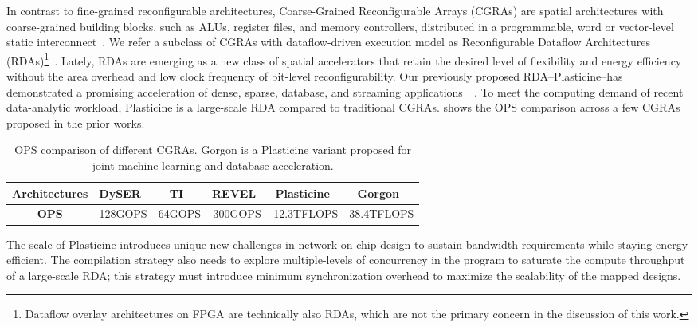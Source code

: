 In contrast to fine-grained reconfigurable architectures,
Coarse-Grained Reconfigurable Arrays (CGRAs) are spatial architectures with 
coarse-grained building blocks, such as ALUs, register files, and memory controllers, 
distributed in a programmable, word or vector-level static interconnect~\cite{adres, kress, dyser, piperench, tartan, 
hrl, hycube}.
We refer a subclass of CGRAs with dataflow-driven execution model as Reconfigurable Dataflow
Architectures (RDAs)\footnote{Dataflow overlay architectures on FPGA are technically also RDAs, which are not the primary concern in the discussion of this work.}~\cite{plasticine, ti, streamdataflow,neuflow,cnndataflow,dataflowarch}.
Lately, RDAs are emerging as a new class of spatial accelerators that retain the desired level of
flexibility and energy efficiency without the area overhead and low clock frequency of bit-level reconfigurability.
Our previously proposed RDA--Plasticine--has demonstrated a promising acceleration of dense, sparse, database, and streaming applications~~\cite{plasticine, gorgon, multijoin,prabhakarthesis}.
To meet the computing demand of recent data-analytic workload, Plasticine is a large-scale RDA
compared to traditional CGRAs. 
 shows the OPS comparison across a few CGRAs proposed in the prior works.

\begin{table}
  \centering
\begin{tabular*}{0.88\textwidth}{cccccc}
  \toprule
  \textbf{Architectures} & DySER~\cite{dyser} & TI~\cite{ti} & REVEL~\cite{revel}
  & Plasticine~\cite{plasticine} & Gorgon~\cite{gorgon}\\\midrule
  \textbf{OPS} & 128GOPS & 64GOPS & 300GOPS & 12.3TFLOPS & 38.4TFLOPS \\
  \bottomrule
\end{tabular*}
\caption[OPS comparison of different CGRAs]{OPS comparison of different CGRAs. Gorgon is a
Plasticine variant proposed for joint machine learning and database acceleration.}
\label{tab:ops}
\end{table}

The scale of Plasticine introduces unique new challenges in network-on-chip design to sustain 
bandwidth requirements while staying energy-efficient.
The compilation strategy also needs to explore multiple-levels of
concurrency in the program to saturate the compute throughput of a large-scale RDA;
this strategy must introduce minimum synchronization overhead to maximize the scalability of the
mapped designs.

